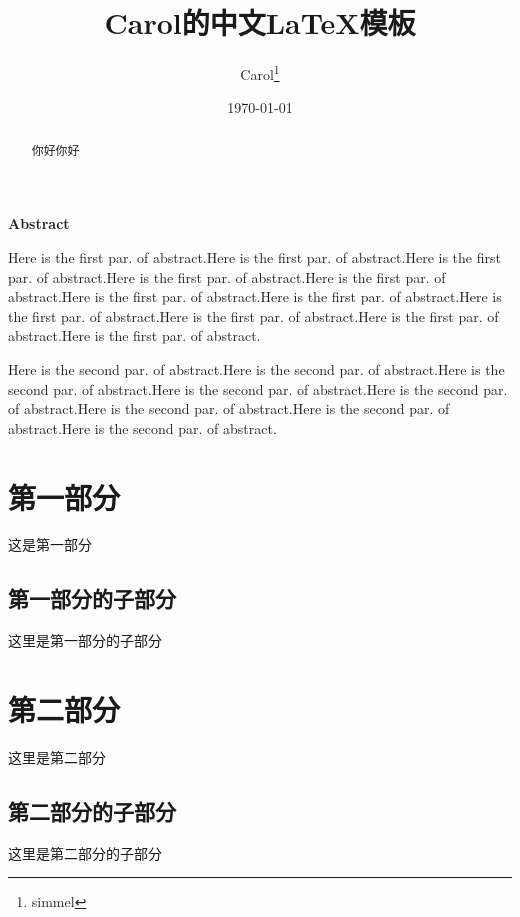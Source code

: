 \documentclass[UTF8,12pt]{ctexart}
\title{\textbf{\Large{Carol的中文\LaTeX{}模板}}}
\author{ Carol\thanks{simmel} }
\date{\today}
\begin{document}
\maketitle

\begin{abstract}
    你好你好
\end{abstract}

\begin{center}
    \large{\textbf{Abstract}}
\end{center}

\begin{adjustwidth}{1cm}{1cm}
    \hspace{1.5em}Here is the first par. of abstract.Here is the first par. of abstract.Here is the first par. of abstract.Here is the first par. of abstract.Here is the first par. of abstract.Here is the first par. of abstract.Here is the first par. of abstract.Here is the first par. of abstract.Here is the first par. of abstract.Here is the first par. of abstract.Here is the first par. of abstract.

    \noindent\hspace{1.5em}Here is the second par. of abstract.Here is the second par. of abstract.Here is the second par. of abstract.Here is the second par. of abstract.Here is the second par. of abstract.Here is the second par. of abstract.Here is the second par. of abstract.Here is the second par. of abstract.
\end{adjustwidth}

\thispagestyle{empty}       %
\newpage                    %
\newpage
\setcounter{page}{1}        %


\section{第一部分}
这是第一部分
\subsection{第一部分的子部分}
这里是第一部分的子部分

\section{第二部分}
这里是第二部分
\subsection{第二部分的子部分}
这里是第二部分的子部分
\end{document}
